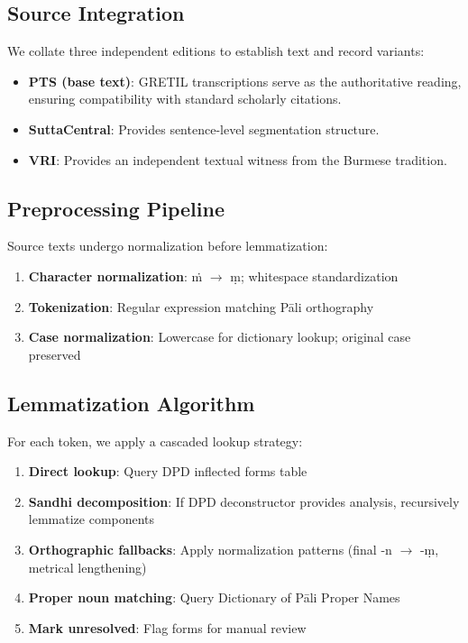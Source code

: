 \documentclass[11pt,twocolumn]{article}
\begin{document}
\subsection{Source Integration}

We collate three independent editions to establish text and record variants:

\begin{itemize}
\item \textbf{PTS (base text)}: GRETIL transcriptions serve as the authoritative reading, ensuring compatibility with standard scholarly citations.
\item \textbf{SuttaCentral}: Provides sentence-level segmentation structure.
\item \textbf{VRI}: Provides an independent textual witness from the Burmese tradition.
\end{itemize}

\subsection{Preprocessing Pipeline}

Source texts undergo normalization before lemmatization:

\begin{enumerate}
\item \textbf{Character normalization}: ṁ $\rightarrow$ ṃ; whitespace standardization
\item \textbf{Tokenization}: Regular expression matching Pāli orthography
\item \textbf{Case normalization}: Lowercase for dictionary lookup; original case preserved
\end{enumerate}

\subsection{Lemmatization Algorithm}

For each token, we apply a cascaded lookup strategy:

\begin{enumerate}
\item \textbf{Direct lookup}: Query DPD inflected forms table
\item \textbf{Sandhi decomposition}: If DPD deconstructor provides analysis, recursively lemmatize components
\item \textbf{Orthographic fallbacks}: Apply normalization patterns (final -n $\rightarrow$ -ṃ, metrical lengthening)
\item \textbf{Proper noun matching}: Query Dictionary of Pāli Proper Names \citep{malalasekera1937}
\item \textbf{Mark unresolved}: Flag forms for manual review
\end{enumerate}
\end{document}
